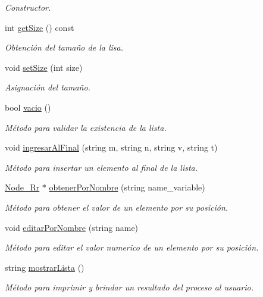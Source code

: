 \begin{DoxyCompactItemize}
\begin{DoxyCompactList}\small\item\em Constructor. \end{DoxyCompactList}\item 
int \hyperlink{classRAM__remoto_acd69f2de32a75322684e5f18505a7ca3}{get\+Size} () const 
\begin{DoxyCompactList}\small\item\em Obtención del tamaño de la lisa. \end{DoxyCompactList}\item 
void \hyperlink{classRAM__remoto_a07109f2a818b34d3541f9ae12a1b3c98}{set\+Size} (int size)
\begin{DoxyCompactList}\small\item\em Asignación del tamaño. \end{DoxyCompactList}\item 
bool \hyperlink{classRAM__remoto_ae5a1cfc10c672b2ef97a57221ab23808}{vacio} ()
\begin{DoxyCompactList}\small\item\em Método para validar la existencia de la lista. \end{DoxyCompactList}\item 
void \hyperlink{classRAM__remoto_a3cacea417d2d7657850e9a8ec4c7fbe7}{ingresar\+Al\+Final} (string m, string n, string v, string t)
\begin{DoxyCompactList}\small\item\em Método para insertar un elemento al final de la lista. \end{DoxyCompactList}\item 
\hyperlink{classNode__Rr}{Node\+\_\+\+Rr} $\ast$ \hyperlink{classRAM__remoto_a96984d3ddcd950aa2559641c04a52f64}{obtener\+Por\+Nombre} (string name\+\_\+variable)
\begin{DoxyCompactList}\small\item\em Método para obtener el valor de un elemento por su posición. \end{DoxyCompactList}\item 
void \hyperlink{classRAM__remoto_a8503c36da05ec14ae6c5d9a0fefef2fe}{editar\+Por\+Nombre} (string name)
\begin{DoxyCompactList}\small\item\em Método para editar el valor numerico de un elemento por su posición. \end{DoxyCompactList}\item 
string \hyperlink{classRAM__remoto_aa19f259be71fd67b2b3c7413fff48eaa}{mostrar\+Lista} ()
\begin{DoxyCompactList}\small\item\em Método para imprimir y brindar un resultado del proceso al usuario. \end{DoxyCompactList}\end{DoxyCompactItemize}


